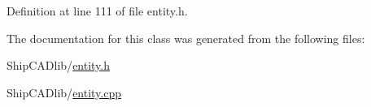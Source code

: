 Definition at line 111 of file entity.\-h.



The documentation for this class was generated from the following files\-:\begin{DoxyCompactItemize}
\item 
Ship\-C\-A\-Dlib/\hyperlink{entity_8h}{entity.\-h}\item 
Ship\-C\-A\-Dlib/\hyperlink{entity_8cpp}{entity.\-cpp}\end{DoxyCompactItemize}
